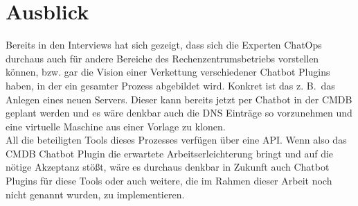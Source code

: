 \section{Ausblick}
Bereits in den Interviews hat sich gezeigt, dass sich die Experten ChatOps durchaus auch für andere Bereiche des Rechenzentrumsbetriebs vorstellen können, bzw. gar die Vision einer Verkettung verschiedener Chatbot Plugins haben, in der ein gesamter Prozess abgebildet wird. Konkret ist das z. B.~das Anlegen eines neuen Servers. Dieser kann bereits jetzt per Chatbot in der \acs{CMDB} geplant werden und es wäre denkbar auch die DNS Einträge so vorzunehmen und eine virtuelle Maschine aus einer Vorlage zu klonen.\\
All die beteiligten Tools dieses Prozesses verfügen über eine \acs{API}. Wenn also das \acs{CMDB} Chatbot Plugin die erwartete Arbeitserleichterung bringt und auf die nötige Akzeptanz stößt, wäre es durchaus denkbar in Zukunft auch Chatbot Plugins für diese Tools oder auch weitere, die im Rahmen dieser Arbeit noch nicht genannt wurden, zu implementieren. 



